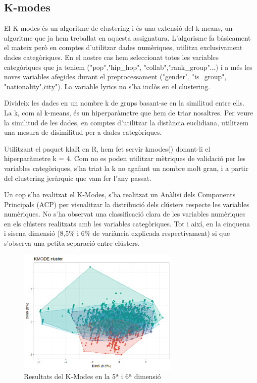 \documentclass{article}
\begin{document}
\subsection{K-modes}

El K-modes és un algoritme de clustering i és una extensió del k-means, un algoritme que ja hem treballat en aquesta assignatura. L'algorisme fa bàsicament el mateix però en comptes d'utilitzar dades numèriques, utilitza exclusivament dades categòriques. En el nostre cas hem seleccionat totes les variables categòriques que ja teniem ("pop","hip\_hop", "collab","rank\_group"...) i a més les noves variables afegides durant el preprocessament ("gender", "is\_group", "nationality",\"city"). La variable lyrics no s'ha inclòs en el clustering.

Divideix les dades en un nombre k de grups basant-se en la similitud entre ells. La k, com al k-means, és un hiperparàmetre que hem de triar nosaltres. Per veure la similitud de les dades, en comptes d'utilitzar la distància euclidiana, utilitzem una mesura de disimilitud per a dades categòriques.

Utilitzant el paquet klaR en R, hem fet servir kmodes() donant-li el hiperparàmetre k = 4. Com no es poden utilitzar mètriques de validació per les variables categòriques, s'ha triat la k no agafant un nombre molt gran, i a partir del clustering jeràrquic que vam fer l'any passat. 

Un cop s'ha realitzat el K-Modes, s'ha realitzat un Anàlisi dels Components Principals (ACP) per visualitzar la distribució dels clústers respecte les variables numèriques. No s'ha observat una classificació clara de les variables numèriques en els clústers realitzats amb les variables categòriques. Tot i així, en la cinquena i sisena dimensió (8,5\% i 6\% de variància explicada respectivament) si que s'observa una petita separació entre clústers.  \\

\begin{figure}[H]
    \centering
    \includegraphics[width=0.7\textwidth]{Images/4_clustering/KMODES/kmodes1.png}
    \caption{Resultats del K-Modes en la 5ª i 6ª dimensió}
    \label{fig:kmodes1}
\end{figure}
\end{document}
